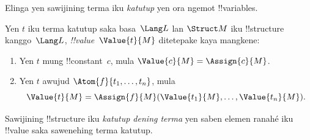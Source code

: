 \documentclass[../../../include/open-logic-section]{subfiles}
\begin{document}


\begin{explain}
Elinga yen sawijining terma iku \emph{katutup} yen ora ngemot
!!{variable}s.
\end{explain}

\begin{defn}
Yen $t$ iku terma katutup saka basa~$\Lang L$ lan $\Struct M$
iku !!{structure} kanggo~$\Lang L$, \emph{!!{value}}~$\Value{t}{M}$
ditetepake kaya mangkene:
\begin{enumerate}
\item Yen $t$ mung !!{constant}~$c$, mula $\Value{c}{M} = \Assign{c}{M}$.
\item Yen $t$ awujud $\Atom{f}{t_1, \ldots, t_n}$, mula
  \[
  \Value{t}{M} = \Assign{f}{M}(\Value{t_1}{M}, \ldots,
  \Value{t_n}{M}).
  \]
\end{enumerate}
\end{defn}

\begin{defn}
Sawijining !!{structure} iku \emph{katutup dening terma} yen saben elemen ranahé
iku !!{value} saka sawenehing terma katutup.
\end{defn}
\end{document}
